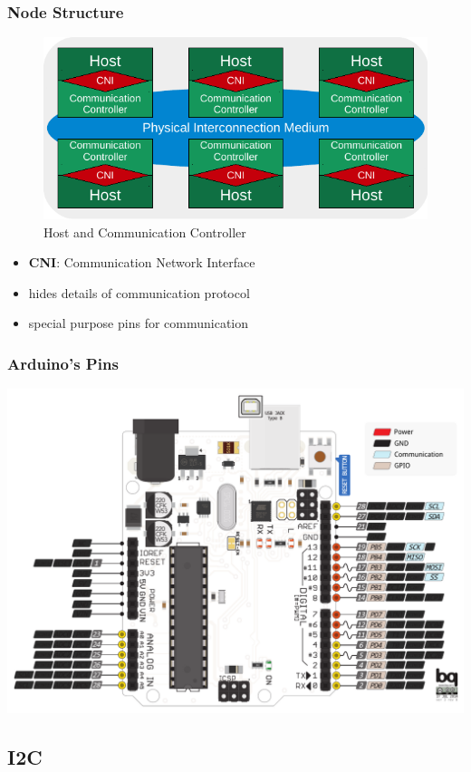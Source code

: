 \documentclass{beamer}
\renewcommand{\emph}[1]{\textbf{\textcolor{greeniot2}{#1}}}
\begin{document}
\begin{frame}
  \frametitle{Node Structure}
  
  \begin{figure}[H]
    \includegraphics[width=.7\textwidth]{images/host-cni.pdf}
    \caption{Host and Communication Controller}
  \end{figure}
   
  \begin{itemize}
    \item \emph{CNI}: Communication Network Interface
    \item hides details of communication protocol
    \item special purpose pins for communication
  \end{itemize}
\end{frame}

\begin{frame}
  \frametitle{Arduino's Pins}
  \centering
  \includegraphics[width=.8\textwidth]{images/uno-focus.pdf}
\end{frame}

\subsection{I2C}
\end{document}
